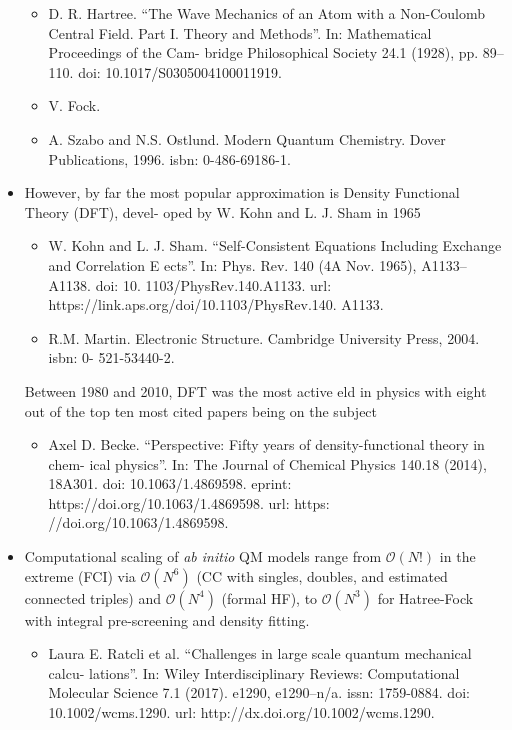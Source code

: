 \documentclass[twoside,english]{uiofysmaster}
\begin{document}
\begin{itemize}
	\begin{itemize}
		\item D. R. Hartree. “The Wave Mechanics of an Atom with a Non-Coulomb Central Field. Part I. Theory and Methods”. In: Mathematical Proceedings of the Cam- bridge Philosophical Society 24.1 (1928), pp. 89–110. doi: 10.1017/S0305004100011919.
		\item V. Fock. %
		\item A. Szabo and N.S. Ostlund. Modern Quantum Chemistry. Dover Publications, 1996. isbn: 0-486-69186-1.
	\end{itemize}
	\item However, by far the most popular approximation is Density Functional Theory (DFT), devel- oped by W. Kohn and L. J. Sham in 1965
	\begin{itemize}
		\item W. Kohn and L. J. Sham. “Self-Consistent Equations Including Exchange and Correlation E ects”. In: Phys. Rev. 140 (4A Nov. 1965), A1133–A1138. doi: 10. 1103/PhysRev.140.A1133. url: https://link.aps.org/doi/10.1103/PhysRev.140. A1133.
		\item R.M. Martin. Electronic Structure. Cambridge University Press, 2004. isbn: 0- 521-53440-2.
	\end{itemize}
	Between 1980 and 2010, DFT was the most active  eld in physics with eight out of the top ten most cited papers being on the subject 
	\begin{itemize}
		\item Axel D. Becke. “Perspective: Fifty years of density-functional theory in chem- ical physics”. In: The Journal of Chemical Physics 140.18 (2014), 18A301. doi: 10.1063/1.4869598. eprint: https://doi.org/10.1063/1.4869598. url: https: //doi.org/10.1063/1.4869598.
	\end{itemize}
	\item Computational scaling of \textit{ab initio} QM models range from $\mathcal{O}(N!)$ in the extreme (FCI) via $\mathcal{O}(N^6)$ (CC with singles, doubles, and estimated connected triples) and $\mathcal{O}(N^4)$ (formal HF), to $\mathcal{O}(N^3)$ for Hatree-Fock with integral pre-screening and density fitting.
	\begin{itemize}
		\item Laura E. Ratcli  et al. “Challenges in large scale quantum mechanical calcu- lations”. In: Wiley Interdisciplinary Reviews: Computational Molecular Science 7.1 (2017). e1290, e1290–n/a. issn: 1759-0884. doi: 10.1002/wcms.1290. url: http://dx.doi.org/10.1002/wcms.1290.
	\end{itemize}
\end{itemize}
\end{document}
